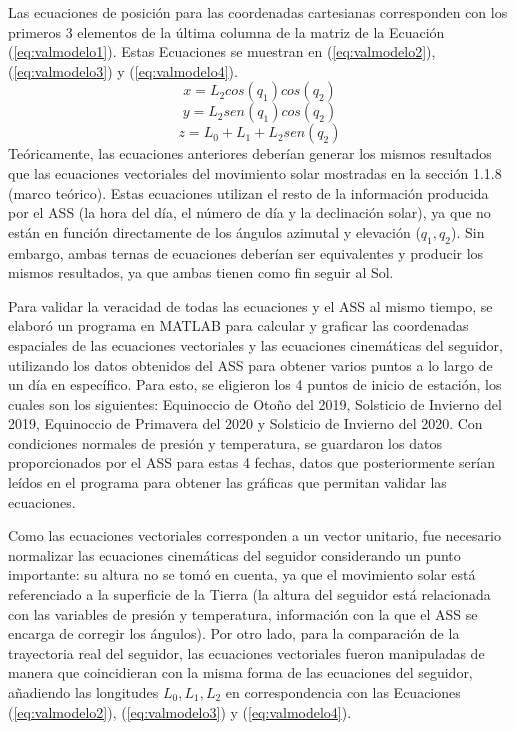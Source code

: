Las ecuaciones de posición para las coordenadas cartesianas corresponden con los primeros 3 elementos de la última columna de la matriz de la Ecuación (\ref{eq:valmodelo1}). Estas Ecuaciones se muestran en (\ref{eq:valmodelo2}), (\ref{eq:valmodelo3}) y (\ref{eq:valmodelo4}).
\begin{equation}\label{eq:valmodelo2}
    x=L_2 cos(q_1) cos(q_2)
\end{equation}
\begin{equation}\label{eq:valmodelo3}
    y=L_2 sen(q_1) cos(q_2)
\end{equation}
\begin{equation}\label{eq:valmodelo4}
    z=L_0+L_1+L_2sen(q_2)
\end{equation}
Teóricamente, las ecuaciones anteriores deberían generar los mismos resultados que las ecuaciones vectoriales del movimiento solar mostradas en la sección 1.1.8 (marco teórico). Estas ecuaciones utilizan el resto de la información producida por el ASS (la hora del día, el número de día y la declinación solar), ya que no están en función directamente de los ángulos azimutal y elevación ($ q_1,q_2 $). Sin embargo, ambas ternas de ecuaciones deberían ser equivalentes y producir los mismos resultados, ya que ambas tienen como fin seguir al Sol.

Para validar la veracidad de todas las ecuaciones y el ASS al mismo tiempo, se elaboró un programa en MATLAB para calcular y graficar las coordenadas espaciales de las ecuaciones vectoriales y las ecuaciones cinemáticas del seguidor, utilizando los datos obtenidos del ASS para obtener varios puntos a lo largo de un día en específico. Para esto, se eligieron los 4 puntos de inicio de estación, los cuales son los siguientes: Equinoccio de Otoño del 2019, Solsticio de Invierno del 2019, Equinoccio de Primavera del 2020 y Solsticio de Invierno del 2020. Con condiciones normales de presión y temperatura, se guardaron los datos proporcionados por el ASS para estas 4 fechas, datos que posteriormente serían leídos en el programa para obtener las gráficas que permitan validar las ecuaciones.

Como las ecuaciones vectoriales corresponden a un vector unitario, fue necesario normalizar las ecuaciones cinemáticas del seguidor considerando un punto importante: su altura no se tomó en cuenta, ya que el movimiento solar está referenciado a la superficie de la Tierra (la altura del seguidor está relacionada con las variables de presión y temperatura, información con la que el ASS se encarga de corregir los ángulos). Por otro lado, para la comparación de la trayectoria real del seguidor, las ecuaciones vectoriales fueron manipuladas de manera que coincidieran con la misma forma de las ecuaciones del seguidor, añadiendo las longitudes $ L_0,L_1,L_2 $ en correspondencia con las Ecuaciones (\ref{eq:valmodelo2}), (\ref{eq:valmodelo3}) y (\ref{eq:valmodelo4}).

